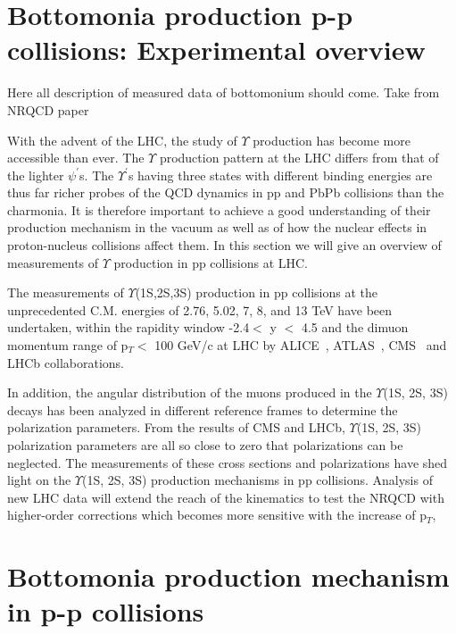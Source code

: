 
\section{Bottomonia production p-p collisions: Experimental overview}

{\color{red}
  Here all description of measured data of bottomonium should come.
  Take from NRQCD paper} 

With the advent of the LHC, the study of $\Upsilon$ production has become more
accessible than ever. The $\Upsilon$ production pattern at the LHC differs from that
of the lighter $\psi^{'}$s. The $\Upsilon^{'}$s having three states with different binding
energies are thus far richer probes of the QCD dynamics in pp and PbPb collisions than
the charmonia. It is therefore important to achieve a good understanding of their
production mechanism in the vacuum as well as of how the nuclear effects in proton-nucleus
collisions affect them. In this section we will give an overview of measurements of $\Upsilon$
production in pp collisions at LHC. 

The measurements of $\Upsilon$(1S,2S,3S) production in pp collisions at the unprecedented C.M. energies
of 2.76, 5.02, 7, 8, and 13 TeV have been undertaken, within the rapidity window -2.4$<$ y $<$ 4.5
and the dimuon momentum range of p$_{T}<$ 100 GeV/c at LHC by ALICE~\cite{ATLAS:2011nal,ATLAS:2012lmu}, ATLAS~\cite{ATLAS:2011nal,ATLAS:2012lmu},
CMS~\cite{CMS:2013qur,CMS:2017dju} and LHCb collaborations.

In addition, the angular distribution of the muons produced in the $\Upsilon$(1S, 2S, 3S) decays has
been analyzed in different reference frames to determine the polarization parameters. From the results
of CMS and LHCb, $\Upsilon$(1S, 2S, 3S) polarization parameters are all so close to zero that polarizations
can be neglected. The measurements of these cross sections and polarizations have shed light on the
$\Upsilon$(1S, 2S, 3S) production mechanisms in pp collisions.
Analysis of new LHC data will extend the reach of the kinematics to test the NRQCD with
higher-order corrections which becomes more sensitive with the increase of p$_{T}$,












\section{Bottomonia production mechanism in p-p collisions}
\label{sec:Bottomonia_pp_th}


